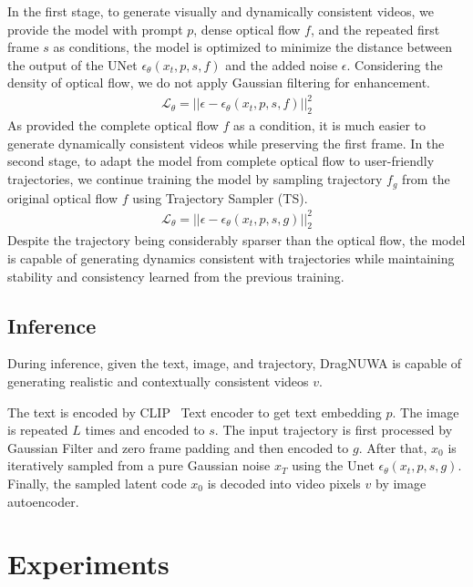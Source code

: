 \documentclass{article} %
\begin{document}
In the first stage, to generate visually and dynamically consistent videos,  we provide the model with prompt $p$, dense optical flow $f$, and the repeated first frame $s$ as conditions, the model is optimized to minimize the distance between the output of the UNet $\epsilon_\theta\left(x_t,p,s,f\right)$ and the added noise $\epsilon$. Considering the density of optical flow, we do not apply Gaussian filtering for enhancement.
\begin{align}
    \mathcal{L}_\theta=\left|\left|\epsilon-\epsilon_\theta\left(x_t,p,s,f\right)\right|\right|_2^2
\end{align}
As provided the complete optical flow $f$ as a condition, it is much easier to generate dynamically consistent videos while preserving the first frame. In the second stage, to adapt the model from complete optical flow to user-friendly trajectories, we continue training the model by sampling trajectory $f_g$ from the original optical flow $f$ using Trajectory Sampler (TS).
\begin{align}
    \mathcal{L}_\theta=\left|\left|\epsilon-\epsilon_\theta\left(x_t,p,s,g\right)\right|\right|_2^2
\end{align}
Despite the trajectory being considerably sparser than the optical flow, the model is capable of generating dynamics consistent with trajectories while maintaining stability and consistency learned from the previous training. 

\subsection{Inference}\label{sec:ui}
During inference, given the text, image, and trajectory, DragNUWA is capable of generating realistic and contextually consistent videos $v$.

The text is encoded by CLIP~\citet{radfordLearningTransferableVisual2021a} Text encoder to get text embedding $p$. The image is repeated $L$ times and encoded to $s$. The input trajectory is first processed by Gaussian Filter and zero frame padding and then encoded to $g$. After that, $x_0$ is iteratively sampled from a pure Gaussian noise $x_T$ using the Unet $\epsilon_\theta\left(x_t,p,s,g\right)$. Finally, the sampled latent code $x_0$ is decoded into video pixels $v$ by image autoencoder.


\section{Experiments}
\end{document}

